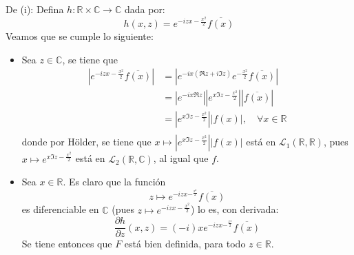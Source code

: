 \documentclass[12pt]{report}
\newcounter{it}
\theoremstyle{largebreak}
\newcommand\abs[1]{\ensuremath{\left|#1\right|}}
\newcommand\cf[3]{\ensuremath{#1:#2\rightarrow#3}}
\newcommand\conj[1]{\ensuremath{\overline{#1}}}
\begin{document}
    \begin{sol}
        De (i): Defina $\cf{h}{\mathbb{R}\times\mathbb{C}}{\mathbb{C}}$ dada por:
        \begin{equation*}
            h(x,z)=e^{ -izx-\frac{x^2}{2}}\conj{f(x)}
        \end{equation*}
        Veamos que se cumple lo siguiente:
        \begin{itemize}
            \item Sea $z\in\mathbb{C}$, se tiene que
            \begin{equation*}
                \begin{split}
                    \abs{e^{ -izx-\frac{x^2}{2}}\conj{f(x)}}&=\abs{e^{ -ix(\Re z+i\Im z)}e^{-\frac{x^2}{2}}\conj{f(x)}}\\
                    &=\abs{e^{-ix\Re z}}\abs{e^{x\Im z-\frac{x^2}{2}}}\abs{\conj{f(x)}}\\
                    &=\abs{e^{x\Im z-\frac{x^2}{2}}}\abs{f(x)},\quad\forall x\in\mathbb{R} \\
                \end{split}
            \end{equation*}
            donde por Hölder, se tiene que $x\mapsto \abs{e^{x\Im z-\frac{x^2}{2}}}\abs{f(x)}$ está en $\mathcal{L}_1(\mathbb{R},\mathbb{R})$, pues $x\mapsto e^{x\Im z-\frac{x^2}{2}}$ está en $\mathcal{L}_2(\mathbb{R},\mathbb{C})$, al igual que $f$.
            \item Sea $x\in\mathbb{R}$. Es claro que la función
            \begin{equation*}
                z\mapsto e^{-izx-^{\frac{x^2}{2}}}\conj{f(x)} 
            \end{equation*}
            es diferenciable en $\mathbb{C}$ (pues $z\mapsto e^{-izx-\frac{x^2}{2}}$) lo es, con derivada:
            \begin{equation*}
                \frac{\partial h}{\partial z}(x,z)=(-i)xe^{-izx-^{\frac{x^2}{2}}}\conj{f(x)}
            \end{equation*}
            Se tiene entonces que $F$ está bien definida, para todo $z\in\mathbb{R}$.


\end{itemize}
\end{sol}
\end{document}
